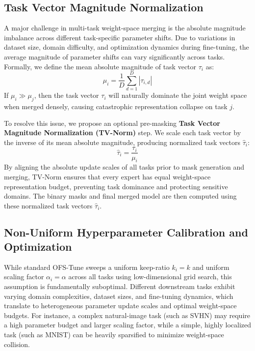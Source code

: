 \subsection{Task Vector Magnitude Normalization}
\label{sub:tv_norm}
A major challenge in multi-task weight-space merging is the absolute magnitude imbalance across different task-specific parameter shifts. Due to variations in dataset size, domain difficulty, and optimization dynamics during fine-tuning, the average magnitude of parameter shifts can vary significantly across tasks. Formally, we define the mean absolute magnitude of task vector $\tau_i$ as:
\begin{equation}
\mu_i = \frac{1}{D} \sum_{d=1}^D |\tau_{i, d}|
\end{equation}
If $\mu_i \gg \mu_j$, then the task vector $\tau_i$ will naturally dominate the joint weight space when merged densely, causing catastrophic representation collapse on task $j$.

To resolve this issue, we propose an optional pre-masking \textbf{Task Vector Magnitude Normalization (TV-Norm)} step. We scale each task vector by the inverse of its mean absolute magnitude, producing normalized task vectors $\hat{\tau}_i$:
\begin{equation}
\hat{\tau}_i = \frac{\tau_i}{\mu_i}
\end{equation}
By aligning the absolute update scales of all tasks prior to mask generation and merging, TV-Norm ensures that every expert has equal weight-space representation budget, preventing task dominance and protecting sensitive domains. The binary masks and final merged model are then computed using these normalized task vectors $\hat{\tau}_i$.

\subsection{Non-Uniform Hyperparameter Calibration and Optimization}
\label{sub:non_uniform_cal}
While standard OFS-Tune sweeps a uniform keep-ratio $k_i = k$ and uniform scaling factor $\alpha_i = \alpha$ across all tasks using low-dimensional grid search, this assumption is fundamentally suboptimal. Different downstream tasks exhibit varying domain complexities, dataset sizes, and fine-tuning dynamics, which translate to heterogeneous parameter update scales and optimal weight-space budgets. For instance, a complex natural-image task (such as SVHN) may require a high parameter budget and larger scaling factor, while a simple, highly localized task (such as MNIST) can be heavily sparsified to minimize weight-space collision.

